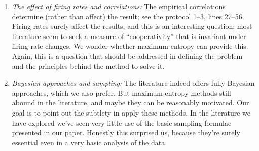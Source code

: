 \documentclass{article}
\begin{document}
\begin{enumerate}[wide]
\item \emph{The effect of firing rates and correlations:} The empirical
  correlations determine (rather than affect) the result; see the protocol
  1--3, lines 27--56. Firing rates surely affect the results, and this is
  an interesting question: most literature seem to seek a measure of
  \enquote{cooperativity} that is invariant under firing-rate changes. We
  wonder whether maximum-entropy can provide this. Again, this is a
  question that should be addressed in defining the problem and the
  principles behind the method to solve it.
\item \emph{Bayesian approaches and sampling:} The literature indeed offers
  fully Bayesian approaches, which we also prefer. But maximum-entropy
  methods still abound in the literature, and maybe they can be reasonably
  motivated. Our goal is to point out the subtlety in apply these methods.
  In the literature we have explored we've seen very little use of the
  basic sampling formulae presented in our paper. Honestly this surprised
  us, because they're surely essential even in a very basic analysis of the
  data.
\end{enumerate}
\end{document}
